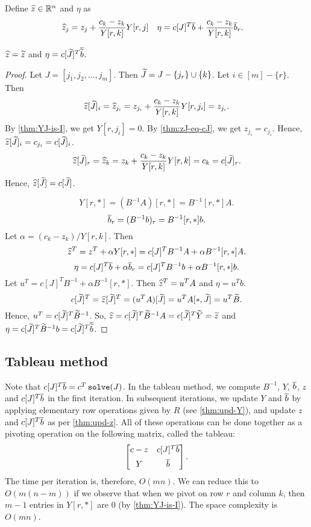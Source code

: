 Define $\widehat{z} \in \mathbb{R}^n$ and $\eta$ as
\begin{align*}
\widehat{z}_j &= z_j + \frac{c_k - z_k}{Y[r,k]} Y[r,j]
& \eta &= c[J]^T\overline{b} + \frac{c_k - z_k}{Y[r, k]}\overline{b}_r.
\end{align*}

\begin{lemma}
\label{thm:upd-z}
$\widehat{z} = \widetilde{z}$ and $\eta = c[\widetilde{J}]^T\overline{\widetilde{b}}$.
\end{lemma}
\begin{proof}
Let $J = [j_1, j_2, \ldots, j_m]$. Then $\widetilde{J} = J - \{j_r\} \cup \{k\}$.
Let $i \in [m] - \{r\}$. Then
\[ \widehat{z}[\widetilde{J}]_i = \widehat{z}_{j_i} = z_{j_i} + \frac{c_k - z_k}{Y[r,k]} Y[r,j_i] = z_{j_i}. \]
By \cref{thm:YJ-is-I}, we get $Y[r,j_i] = 0$.
By \cref{thm:zJ-eq-cJ}, we get $z_{j_i} = c_{j_i}$.
Hence, $\widehat{z}[\widetilde{J}]_i = c_{j_i} = c[\widetilde{J}]_i$.
\[ \widehat{z}[\widetilde{J}]_r = \widehat{z}_k = z_k + \frac{c_k - z_k}{Y[r,k]} Y[r,k] = c_k = c[\widetilde{J}]_r. \]
Hence, $\widehat{z}[\widetilde{J}] = c[\widetilde{J}]$.

\[ Y[r,*] = (B^{-1}A)[r,*] = B^{-1}[r,*]A. \]
\[ \overline{b}_r = (B^{-1}b)_r = B^{-1}[r,*]b. \]
Let $\alpha = (c_k - z_k)/Y[r,k]$. Then
\[ \widehat{z}^T = z^T + \alpha Y[r,*] = c[J]^TB^{-1}A + \alpha B^{-1}[r,*]A. \]
\[ \eta = c[J]^T\overline{b} + \alpha \overline{b}_r = c[J]^TB^{-1}b + \alpha B^{-1}[r,*]b. \]
Let $u^T = c[J]^TB^{-1} + \alpha B^{-1}[r,*]$. Then $\widehat{z}^T = u^TA$ and $\eta = u^Tb$.
\[ c[\widetilde{J}]^T = \widehat{z}[\widetilde{J}]^T = (u^TA)[\widetilde{J}] = u^TA[*,\widetilde{J}] = u^T\widetilde{B}. \]
Hence, $u^T = c[\widetilde{J}]^T\widetilde{B}^{-1}$.
So, $\widehat{z} = c[\widetilde{J}]^T\widetilde{B}^{-1}A = c[\widetilde{J}]^T\widetilde{Y} = \widetilde{z}$
and $\eta = c[\widetilde{J}]^T\widetilde{B}^{-1}b = c[\widetilde{J}]^T\overline{\widetilde{b}}$.
\end{proof}

\subsection{Tableau method}

Note that $c[J]^T\overline{b} = c^T\operatorname{\mathtt{solve}}(J)$.
In the tableau method, we compute $B^{-1}$, $Y$, $\overline{b}$, $z$ and $c[J]^T\overline{b}$ in the first iteration.
In subsequent iterations, we update $Y$ and $\overline{b}$
by applying elementary row operations given by $R$ (see \cref{thm:upd-Y}),
and update $z$ and $c[J]^T\overline{b}$ as per \cref{thm:upd-z}.
All of these operations can be done together as a pivoting operation
on the following matrix, called the tableau:
\[ \begin{bmatrix} c - z & c[J]^T\overline{b} \\[0.5em] Y & \overline{b} \end{bmatrix}. \]
The time per iteration is, therefore, $O(mn)$.
We can reduce this to $O(m(n-m))$ if we observe that when we pivot on row $r$ and column $k$,
then $m-1$ entries in $Y[r,*]$ are 0 (by \cref{thm:YJ-is-I}).
The space complexity is $O(mn)$.

